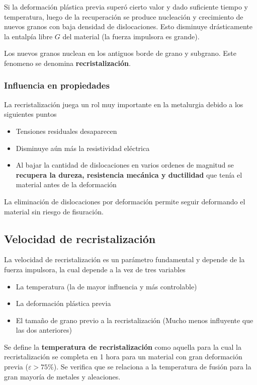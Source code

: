 Si la deformación plástica previa superó cierto valor y dado suficiente tiempo y temperatura, luego de la recuperación se produce nucleación y crecimiento de nuevos granos con baja densidad de dislocaciones. Esto disminuye drásticamente la entalpía libre $G$ del material (la fuerza impulsora es grande).

Los nuevos granos nuclean en los antiguos borde de grano y subgrano. Este fenomeno se denomina \textbf{recristalización}.

\subsubsection{Influencia en propiedades}
La recristalización juega un rol muy importante en la metalurgia debido a los siguientes puntos

\begin{itemize}
	\item Tensiones residuales desaparecen
	\item Disminuye aún más la resistividad eléctrica
	\item Al bajar la cantidad de dislocaciones en varios ordenes de magnitud se \textbf{recupera la dureza, resistencia mecánica y ductilidad} que tenía el material antes de la deformación
\end{itemize}

La eliminación de dislocaciones por deformación permite seguir deformando el material sin riesgo de fisuración.

\subsection{Velocidad de recristalización}

La velocidad de recristalización es un parámetro fundamental y depende de la fuerza impulsora, la cual depende a la vez de tres variables
\begin{itemize}
	\item La temperatura (la de mayor influencia y más controlable)
	\item La deformación plástica previa
	\item El tamaño de grano previo a la recristalización (Mucho menos influyente que las dos anteriores)
\end{itemize}

Se define la \textbf{temperatura de recristalización} como aquella para la cual la recristalización se completa en 1 hora para un material con gran deformación previa ($\varepsilon > 75\%$). Se verifica que se relaciona a la temperatura de fusión para la gran mayoría de metales y aleaciones.


